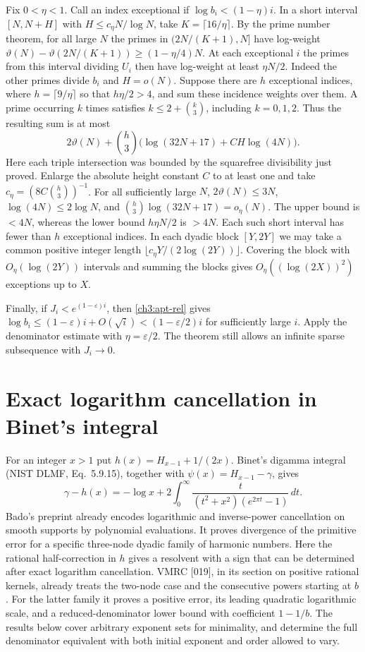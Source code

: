 \documentclass[11pt,a4paper,oneside,openany]{report}
\theoremstyle{remark}\newtheorem{remark}[theorem]{Remark}
\numberwithin{equation}{section}
\begin{document}
Fix $0<\eta<1$. Call an index exceptional if
$\log b_i<(1-\eta)i$. In a short interval $[N,N+H]$ with
$H\le c_\eta N/\log N$, take $K=\lceil16/\eta\rceil$. By the prime
number theorem, for all large $N$ the primes in $(2N/(K+1),N]$ have log-weight
$\vartheta(N)-\vartheta(2N/(K+1))\ge(1-\eta/4)N$.
At each exceptional $i$ the primes from this interval dividing $U_i$
then have log-weight at least $\eta N/2$. Indeed the other primes
divide $b_i$ and $H=o(N)$. Suppose there are $h$ exceptional
indices, where $h=\lceil9/\eta\rceil$ so that $h\eta/2>4$, and sum
these incidence weights over them. A prime occurring $k$ times
satisfies $k\le2+\binom{k}{3}$, including $k=0,1,2$.
Thus the resulting sum is at most
\[
 2\vartheta(N)+\binom h3
       \bigl(\log(32N+17)+CH\log(4N)\bigr).
\]
Here each triple intersection was bounded by the squarefree divisibility
just proved. Enlarge the absolute height constant $C$ to at least one
and take $c_\eta=(8C\binom h3)^{-1}$. For all sufficiently large $N$,
$2\vartheta(N)\le3N$, $\log(4N)\le2\log N$, and
$\binom h3\log(32N+17)=o_\eta(N)$. The upper bound is $<4N$, whereas
the lower bound $h\eta N/2$ is $>4N$. Each such short interval has
fewer than $h$ exceptional indices. In each dyadic block $[Y,2Y]$
we may take a common positive integer length
$\lfloor c_\eta Y/(2\log(2Y))\rfloor$. Covering the block with
$O_\eta(\log(2Y))$ intervals and summing the blocks gives
$O_\eta((\log(2X))^2)$ exceptions up to $X$.

Finally, if $J_i<e^{(1-\varepsilon)i}$, then \eqref{ch3:apt-rel} gives
$\log b_i\le(1-\varepsilon)i+O(\sqrt i)<(1-\varepsilon/2)i$
for sufficiently large $i$. Apply the denominator estimate with
$\eta=\varepsilon/2$. The theorem still allows an infinite sparse
subsequence with $J_i\to0$.

\section{Exact logarithm cancellation in Binet's integral}
\label{ch3:r3:binet}

For an integer $x>1$ put $h(x)=H_{x-1}+1/(2x)$.
Binet's digamma integral (NIST DLMF, Eq.~5.9.15), together with
$\psi(x)=H_{x-1}-\gamma$, gives
\begin{equation}\label{ch3:r3:binetidentity}
 \gamma-h(x)=-\log x+
 2\int_0^\infty\frac{t}{(t^2+x^2)(e^{2\pi t}-1)}\,dt.
\end{equation}
Bado's preprint \cite[Sections 6--9]{bado} already encodes
logarithmic and inverse-power cancellation on smooth supports
by polynomial evaluations. It proves divergence of the primitive
error for a specific three-node dyadic family of harmonic numbers.
Here the rational half-correction in $h$ gives a resolvent with
a sign that can be determined after exact logarithm cancellation.
VMRC [019], in its section on positive rational kernels, already treats
the two-node case and the consecutive powers starting at $b$. For the
latter family it proves a positive error, its leading quadratic logarithmic
scale, and a reduced-denominator lower bound with coefficient $1-1/b$.
The results below cover arbitrary exponent sets for minimality, and
determine the full denominator equivalent with both initial exponent
and order allowed to vary.
\end{document}
